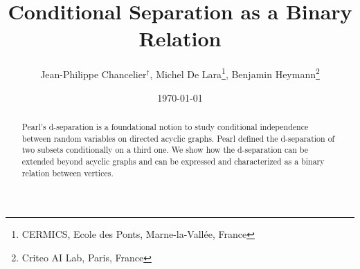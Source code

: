 \documentclass[12pt]{article}
\title{Conditional Separation as a Binary Relation}%
\author{%
  Jean-Philippe Chancelier$^\dagger$,
  Michel De Lara\footnote{CERMICS, Ecole des Ponts, Marne-la-Vall\'ee, France},
  Benjamin Heymann\footnote{Criteo AI Lab, Paris, France}
}
\date{\today}
\begin{document}
\maketitle

\begin{abstract}
  Pearl's d-separation is a foundational notion to study conditional
  independence between random variables on directed acyclic graphs.
  Pearl defined the d-separation of two subsets conditionally on a third one.
  We show how the d-separation can be extended beyond acyclic graphs
  and can be expressed and characterized as a binary relation between vertices. 
\end{abstract}

\setcounter{tocdepth}{2}
\pagebreak\tableofcontents \pagebreak 
\end{document}
